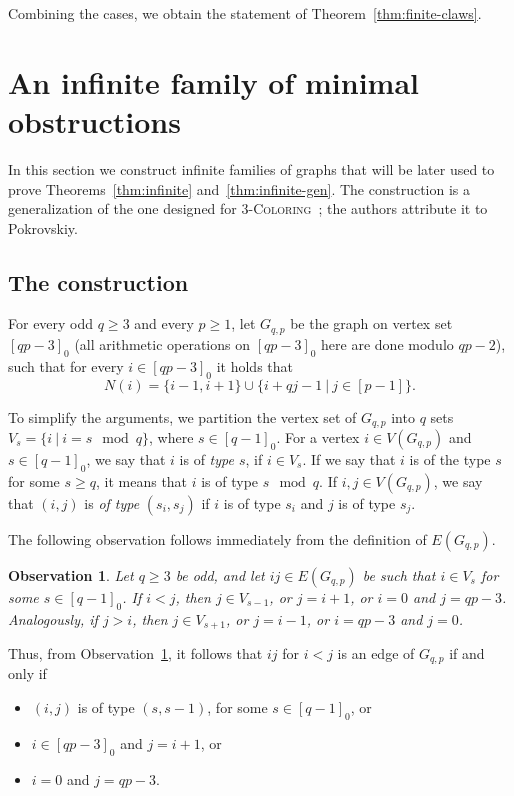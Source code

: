 \documentclass[11pt,a4paper]{article}
\theoremstyle{mystyle}
\newtheorem{observation}[theorem]{Observation}
\newcommand{\colo}[1]{\ensuremath{#1}-\textsc{Coloring}\xspace}
\begin{document}
Combining the cases, we obtain the statement of Theorem~\ref{thm:finite-claws}.

\section{An infinite family of minimal obstructions}\label{sec:infinite}
In this section we construct infinite families of graphs that will be later used to prove Theorems~\ref{thm:infinite} and~\ref{thm:infinite-gen}. The construction is a generalization of the one designed for \colo{3}~\cite{DBLP:journals/jct/ChudnovskyGSZ20}; the authors attribute it to Pokrovskiy.

\subsection{The construction}

For every odd $q \geq 3$ and every $p \geq 1$, let $G_{q,p}$ be the graph on vertex set $[qp-3]_0$ (all arithmetic operations on $[qp-3]_0$ here are done modulo $qp-2$), such that for every $i \in [qp-3]_0$ it holds that
\[N(i)=\{{i-1},{i+1}\} \cup \{{i+qj-1} ~|~ j \in [p-1] \}. \]

To simplify the arguments, we partition the vertex set of $G_{q,p}$ into $q$ sets $V_s=\{i~|~i = s \mod q\}$, where $s \in [q-1]_0$. For a vertex $i \in V(G_{q,p})$ and $s \in [q-1]_0$, we say that $i$ is of \emph{type $s$}, if $i \in V_{s}$.
If we say that $i$ is of the type $s$ for some $s \geq q$, it means that $i$ is of type $s \mod q$.
If $i,j \in V(G_{q,p})$, we say that $(i,j)$ is \emph{of type} $(s_i,s_j)$ if $i$ is of type $s_i$ and $j$ is of type $s_j$.

The following observation follows immediately from the definition of $E(G_{q,p})$.
\begin{observation}\label{obs:neighbors}
Let $q \geq 3$ be odd, and let $ij \in E(G_{q,p})$ be such that $i \in V_s$ for some $s \in [q-1]_0$. If $i<j$, then $j \in V_{s-1}$, or $j=i+1$, or $i=0$ and $j=qp-3$. Analogously, if $j>i$, then $j \in V_{s+1}$, or $j=i-1$, or $i=qp-3$ and $j=0$.
\end{observation}

Thus, from Observation~\ref{obs:neighbors}, it follows that $ij$ for $i <j$ is an edge of $G_{q,p}$ if and only if 
\begin{itemize}
    \item $(i,j)$ is of type $(s,s-1)$, for some $s \in [q-1]_0$, or
    \item $i \in [qp-3]_0$ and $j=i+1$, or
    \item $i={0}$ and $j={qp-3}$.
\end{itemize}
\end{document}
